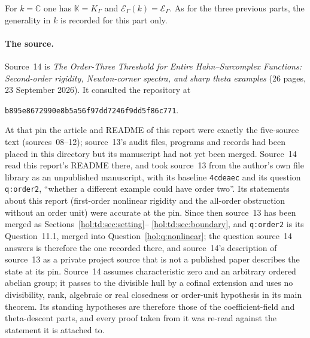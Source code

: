\documentclass[11pt]{article}
\numberwithin{equation}{section}
\theoremstyle{definition}
\theoremstyle{remark}
\newcommand{\C}{\mathbb C}
\newcommand{\K}{K_\Gamma}
\newcommand{\E}{\mathcal E_\Gamma}
\newcommand{\KK}{\mathbb K}
\newcommand{\EK}{\mathcal E_\Gamma(k)}
\begin{document}
For $k=\C$ one has $\KK=\K$ and $\EK=\E$. As for the three previous parts,
the generality in $k$ is recorded for this part only.

\paragraph{The source.}
Source~14 is \emph{The Order-Three Threshold for Entire Hahn--Surcomplex
Functions: Second-order rigidity, Newton-corner spectra, and sharp theta
examples} (26 pages, 23 September 2026). It consulted the repository at
\begin{center}\small\texttt{b895e8672990e8b5a56f97dd7246f9dd5f86c771}.\end{center}
At that pin the article and README of this report were exactly the five-source
text (sources~08--12); source~13's audit files, programs and records had been
placed in this directory but its manuscript had not yet been merged. Source~14
read this report's README there, and took source~13 from the author's own
file library as an unpublished manuscript, with its baseline \texttt{4cdeaec}
and its question \texttt{q:order2}, ``whether a different example could have
order two''. Its statements about this report (first-order nonlinear rigidity
and the all-order obstruction without an order unit) were accurate at the pin.
Since then source~13 has been merged as Sections~\ref{hol:td:sec:setting}--%
\ref{hol:td:sec:boundary}, and \texttt{q:order2} is its Question~11.1, merged
into Question~\ref{hol:q:nonlinear}; the question source~14 answers is
therefore the one recorded there, and source~14's description of source~13 as
a private project source that is not a published paper describes the state at
its pin. Source~14 assumes characteristic zero and an arbitrary ordered
abelian group; it passes to the divisible hull by a cofinal extension and
uses no divisibility, rank, algebraic or real closedness or order-unit
hypothesis in its main theorem. Its standing hypotheses are therefore those of
the coefficient-field and theta-descent parts, and every proof taken from it
was re-read against the statement it is attached to.
\end{document}
